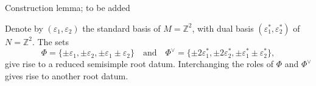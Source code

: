 \begin{lemma}
    Construction lemma; to be added
\end{lemma}




\begin{example}
Denote by $(\varepsilon_1, \varepsilon_2)$ the standard basis 
of $M = \mathbb{Z}^2$, 
with dual basis $(\varepsilon_1^*, \varepsilon_2^*)$ of $N = \mathbb{Z}^2$. The sets 
\[
    \Phi = \{\pm \varepsilon_1, \pm \varepsilon_2, \pm\varepsilon_1\pm\varepsilon_2\} \quad \text{and} \quad
    \Phi^\vee = \{\pm 2\varepsilon^*_1, \pm 2 \varepsilon^*_2, \pm \varepsilon_1^* \pm \varepsilon_2^* \},
\]
give rise to a reduced semisimple root datum. Interchanging the roles of $\Phi$ and $\Phi^\vee$ gives rise to another root datum.
\end{example}


